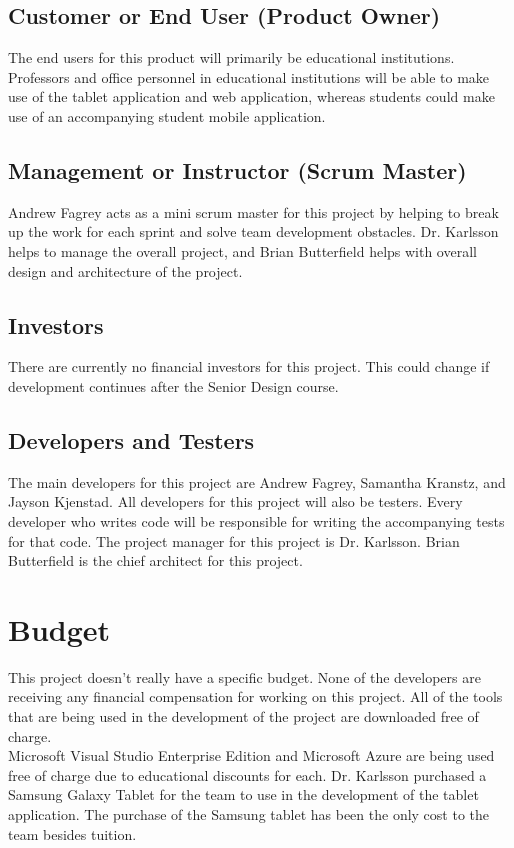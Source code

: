 \subsection{Customer or End User (Product Owner)}
The end users for this product will primarily be educational institutions. Professors and office personnel in educational institutions will be able to make use of the tablet application and web application, whereas students could make use of an accompanying student mobile application.

\subsection{Management or Instructor (Scrum Master)}
Andrew Fagrey acts as a mini scrum master for this project by helping to break up the work for each sprint and solve team development obstacles. Dr. Karlsson helps to manage the overall project, and Brian Butterfield helps with overall design and architecture of the project. 

\subsection{Investors}
There are currently no financial investors for this project. This could change if development continues after the Senior Design course.

\subsection{Developers and Testers}
The main developers for this project are Andrew Fagrey, Samantha Kranstz, and Jayson Kjenstad. All developers for this project will also be testers. Every developer who writes code will be responsible for writing the accompanying tests for that code. The project manager for this project is Dr. Karlsson. Brian Butterfield is the chief architect for this project.

\section{Budget}
This project doesn't really have a specific budget. None of the developers are receiving any financial compensation for working on this project. All of the tools that are being used in the development of the project are downloaded free of charge.\\

\noindent Microsoft Visual Studio Enterprise Edition and Microsoft Azure are being used free of charge due to 
educational discounts for each. Dr. Karlsson purchased a Samsung Galaxy Tablet for the team to use in the development of the tablet application. The purchase of the Samsung tablet has been the only cost to the team besides tuition.

